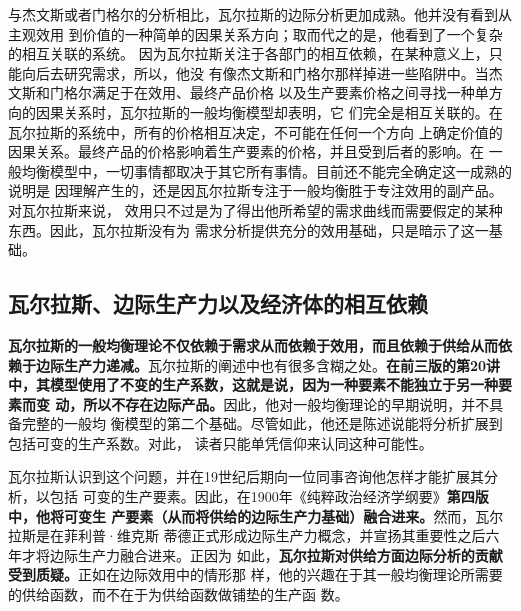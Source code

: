 与杰文斯或者门格尔的分析相比，瓦尔拉斯的边际分析更加成熟。他并没有看到从主观效用
到价值的一种简单的因果关系方向；取而代之的是，他看到了一个复杂的相互关联的系统。
因为瓦尔拉斯关注于各部门的相互依赖，在某种意义上，只能向后去研究需求，所以，他没
有像杰文斯和门格尔那样掉进一些陷阱中。当杰文斯和门格尔满足于在效用、最终产品价格
以及生产要素价格之间寻找一种单方向的因果关系时，瓦尔拉斯的一般均衡模型却表明，它
们完全是相互关联的。在瓦尔拉斯的系统中，所有的价格相互决定，不可能在任何一个方向
上确定价值的因果关系。最终产品的价格影响着生产要素的价格，并且受到后者的影响。在
一般均衡模型中，一切事情都取决于其它所有事情。目前还不能完全确定这一成熟的说明是
因理解产生的，还是因瓦尔拉斯专注于一般均衡胜于专注效用的副产品。对瓦尔拉斯来说，
效用只不过是为了得出他所希望的需求曲线而需要假定的某种东西。因此，瓦尔拉斯没有为
需求分析提供充分的效用基础，只是暗示了这一基础。

\subsection{瓦尔拉斯、边际生产力以及经济体的相互依赖}

\textbf{瓦尔拉斯的一般均衡理论不仅依赖于需求从而依赖于效用，而且依赖于供给从而依
  赖于边际生产力递减。}瓦尔拉斯的阐述中也有很多含糊之处。\textbf{在前三版的第20讲
  中，其模型使用了不变的生产系数，这就是说，因为一种要素不能独立于另一种要素而变
  动，所以不存在边际产品。}因此，他对一般均衡理论的早期说明，并不具备完整的一般均
衡模型的第二个基础。尽管如此，他还是陈述说能将分析扩展到包括可变的生产系数。对此，
读者只能单凭信仰来认同这种可能性。

瓦尔拉斯认识到这个问题，并在19世纪后期向一位同事咨询他怎样才能扩展其分析，以包括
可变的生产要素。因此，在1900年《纯粹政治经济学纲要》\textbf{第四版中，他将可变生
  产要素（从而将供给的边际生产力基础）融合进来。}然而，瓦尔拉斯是在菲利普·维克斯
蒂德正式形成边际生产力概念，并宣扬其重要性之后六年才将边际生产力融合进来。正因为
如此，\textbf{瓦尔拉斯对供给方面边际分析的贡献受到质疑。}正如在边际效用中的情形那
样，他的兴趣在于其一般均衡理论所需要的供给函数，而不在于为供给函数做铺垫的生产函
数。

